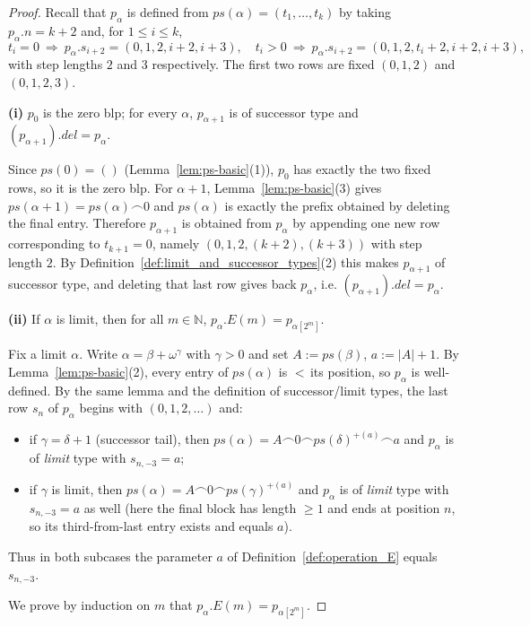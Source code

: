 \documentclass[10pt,a4paper]{amsart}
\begin{document}
\begin{proof}
Recall that $p_\alpha$ is defined from $ps(\alpha)=(t_1,\dots,t_k)$ by taking
$p_\alpha.n=k+2$ and, for $1\le i\le k$,
\[
t_i=0 \ \Rightarrow\ p_\alpha.s_{i+2}=(0,1,2,i+2,i+3),\quad
t_i>0 \ \Rightarrow\ p_\alpha.s_{i+2}=(0,1,2,t_i+2,i+2,i+3),
\]
with step lengths $2$ and $3$ respectively. The first two rows are fixed
$(0,1,2)$ and $(0,1,2,3)$.

\smallskip
\noindent\textbf{(i) } $p_0$ is the zero blp; for every $\alpha$, $p_{\alpha+1}$ is of successor type and $(p_{\alpha+1})\!.del=p_\alpha$.

Since $ps(0)=()$ (Lemma~\ref{lem:ps-basic}(1)), $p_0$ has exactly the two fixed rows, so it is the zero blp.
For $\alpha+1$, Lemma~\ref{lem:ps-basic}(3) gives
\(
ps(\alpha+1)=ps(\alpha)\frown 0
\)
and $ps(\alpha)$ is exactly the prefix obtained by deleting the final entry.
Therefore $p_{\alpha+1}$ is obtained from $p_\alpha$ by appending one new row
corresponding to $t_{k+1}=0$, namely $(0,1,2,(k+2),(k+3))$ with step length $2$.
By Definition~\ref{def:limit_and_successor_types}(2) this makes $p_{\alpha+1}$ of
successor type, and deleting that last row gives back $p_\alpha$, i.e.
$(p_{\alpha+1})\!.del=p_\alpha$.

\smallskip
\noindent\textbf{(ii) } If $\alpha$ is limit, then for all $m\in\mathbb{N}$,
\(
p_\alpha.E(m)=p_{\alpha[2^m]}.
\)

Fix a limit $\alpha$. Write $\alpha=\beta+\omega^\gamma$ with $\gamma>0$ and set
$A:=ps(\beta)$, $a:=|A|+1$. By Lemma~\ref{lem:ps-basic}(2), every entry of $ps(\alpha)$ is
$<\,$its position, so $p_\alpha$ is well-defined. By the same lemma and the
definition of successor/limit types, the last row $s_{n}$ of $p_\alpha$ begins with
$(0,1,2,\dots)$ and:
\begin{itemize}
  \item if $\gamma=\delta+1$ (successor tail), then $ps(\alpha)=A\frown 0\frown ps(\delta)^{+(a)}\frown a$ and $p_\alpha$ is of \emph{limit} type with $s_{n,-3}=a$;
  \item if $\gamma$ is limit, then $ps(\alpha)=A\frown 0\frown ps(\gamma)^{+(a)}$ and $p_\alpha$ is of \emph{limit} type with $s_{n,-3}=a$ as well (here the final block has length $\ge1$ and ends at position $n$, so its third-from-last entry exists and equals $a$).
\end{itemize}
Thus in both subcases the parameter $a$ of Definition~\ref{def:operation_E} equals
$s_{n,-3}$.

We prove by induction on $m$ that $p_\alpha.E(m)=p_{\alpha[2^m]}$.


\end{proof}
\end{document}
